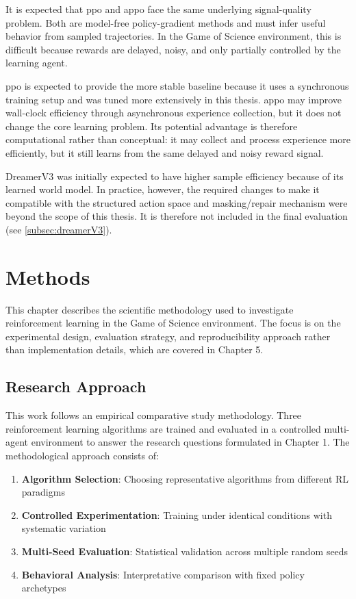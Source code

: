 \documentclass[english,bachelor]{hsluthesis}
\begin{document}
It is expected that \gls{ppo} and \gls{appo} face the same underlying signal-quality problem. Both are model-free policy-gradient methods and must infer useful behavior from sampled trajectories. In the Game of Science environment, this is difficult because rewards are delayed, noisy, and only partially controlled by the learning agent.

\gls{ppo} is expected to provide the more stable baseline because it uses a synchronous training setup and was tuned more extensively in this thesis. \gls{appo} may improve wall-clock efficiency through asynchronous experience collection, but it does not change the core learning problem. Its potential advantage is therefore computational rather than conceptual: it may collect and process experience more efficiently, but it still learns from the same delayed and noisy reward signal.

DreamerV3 was initially expected to have higher sample efficiency because of its learned world model. In practice, however, the required changes to make it compatible with the structured action space and masking/repair mechanism were beyond the scope of this thesis. It is therefore not included in the final evaluation (see \ref{subsec:dreamerV3}).

\chapter{Methods}

This chapter describes the scientific methodology used to investigate reinforcement learning in the Game of Science environment. The focus is on the experimental design, evaluation strategy, and reproducibility approach rather than implementation details, which are covered in Chapter 5.

\section{Research Approach}

This work follows an empirical comparative study methodology. Three reinforcement learning algorithms are trained and evaluated in a controlled multi-agent environment to answer the research questions formulated in Chapter 1. The methodological approach consists of:

\begin{enumerate}
    \item \textbf{Algorithm Selection}: Choosing representative algorithms from different RL paradigms
    \item \textbf{Controlled Experimentation}: Training under identical conditions with systematic variation
    \item \textbf{Multi-Seed Evaluation}: Statistical validation across multiple random seeds
    \item \textbf{Behavioral Analysis}: Interpretative comparison with fixed policy archetypes
\end{enumerate}
\end{document}
